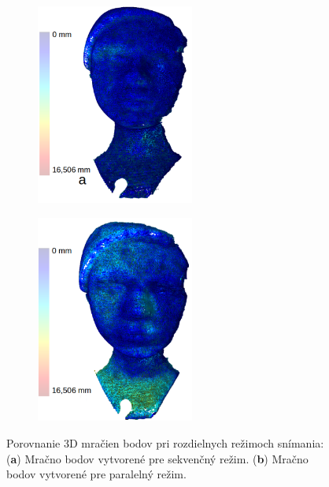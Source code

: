 \begin{figure}[h]
	\centering
	\begin{subfigure}[b]{0.49\textwidth}
		\centering
		\includegraphics[width=0.57\textwidth]{figures/calibration_hausdorff_single_calib.png}
		\caption{}
		\label{fig:calib:haus:single:calib}
	\end{subfigure}
	\begin{subfigure}[b]{0.49\textwidth}
		\centering
		\includegraphics[width=0.57\textwidth]{figures/calibration_hausdorff_single_uncalib.png}
		\caption{}
		\label{fig:calib:haus:single:uncalib}
	\end{subfigure}
	\caption{Porovnanie 3D mračien bodov pri rozdielnych režimoch snímania: (\textbf{a}) Mračno bodov vytvorené pre sekvenčný režim. (\textbf{b}) Mračno bodov vytvorené pre paralelný režim.}
	\label{fig:calib:haus:single}
\end{figure}


